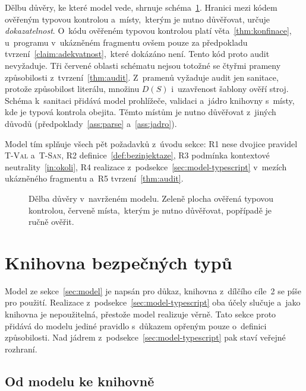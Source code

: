 Dělbu důvěry, ke které model vede, shrnuje schéma~\ref{fig:tcb}. Hranici mezi kódem ověřeným typovou kontrolou a~místy,~kterým je nutno důvěřovat, určuje \emph{dokazatelnost}. O~kódu ověřeném typovou kontrolou platí věta~\ref{thm:konfinace}, u~programu v~ukázněném fragmentu ovšem pouze za předpokladu tvrzení~\ref{claim:adekvatnost},~které dokázáno není. Tento kód proto audit nevyžaduje. Tři červené oblasti schématu nejsou totožné se čtyřmi prameny způsobilosti z~tvrzení~\ref{thm:audit}. Z~pramenů vyžaduje audit jen sanitace, protože způsobilost literálu, množinu $D(S)$ i~uzavřenost šablony ověří stroj. Schéma k~sanitaci přidává model prohlížeče, validaci a~jádro knihovny s~místy, kde je typová kontrola obejita. Těmto místům je nutno důvěřovat z~jiných důvodů (předpoklady~\ref{ass:parse} a~\ref{ass:jadro}).

Model tím splňuje všech pět požadavků z~úvodu sekce: R1 nese dvojice pravidel \textsc{T-Val} a~\textsc{T-San}, R2 definice~\ref{def:bezinjektaze}, R3 podmínka kontextové neutrality~\eqref{in:okoli}, R4 realizace z~podsekce~\ref{sec:model-typescript} v~mezích ukázněného fragmentu a~R5 tvrzení~\ref{thm:audit}.

\begin{figure}[htbp]
    \centering
    \caption[Dělba důvěry v~navrženém modelu]{Dělba důvěry v~navrženém modelu. Zeleně plocha ověřená typovou kontrolou, červeně místa,~kterým je nutno důvěřovat, popřípadě je ručně ověřit.}
    \label{fig:tcb}
\end{figure}

\section{Knihovna bezpečných typů}
\label{sec:lib}

Model ze sekce~\ref{sec:model} je napsán pro důkaz, knihovna z~dílčího cíle~2 se píše pro použití. Realizace z~podsekce~\ref{sec:model-typescript} oba účely slučuje a~jako knihovna je nepoužitelná, přestože model realizuje věrně. Tato sekce proto přidává do modelu jediné pravidlo s~důkazem opřeným pouze o~definici způsobilosti. Nad jádrem z~podsekce~\ref{sec:model-typescript} pak staví veřejné rozhraní.

\subsection{Od modelu ke knihovně}
\label{sec:lib-motivace}

